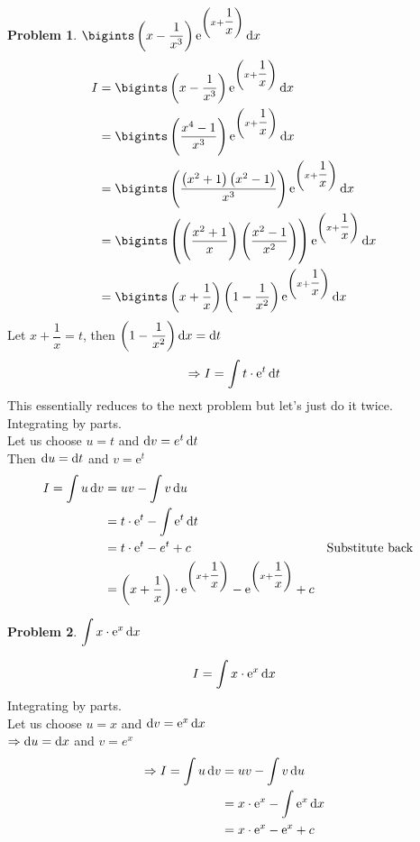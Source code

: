 \documentclass[14]{article}
\theoremstyle{definition}
\newtheorem{prob}{Problem}
\theoremstyle{case}
\begin{document}
\begin{prob}
$\displaystyle \bigints \left( x - \dfrac1{x^3} \right) {\mathrm{e}}^{\left(x + \dfrac1x\right)} \dif x$
\begin{align*}
I &= \bigints \left( x - \dfrac1{x^3} \right) {\mathrm{e}}^{\left(x + \dfrac1x\right)} \dif x\\
&=\bigints \left(\dfrac{x^4 - 1}{x^3} \right) {\mathrm{e}}^{\left(x + \dfrac1x\right)} \dif x\\
&=\bigints \left(\dfrac{\left(x^2 + 1\right)\left(x^2 - 1\right)}{x^3} \right) {\mathrm{e}}^{\left(x + \dfrac1x\right)} \dif x\\
&= \bigints \left( \left( \dfrac{x^2 + 1}{x} \right) \left( \dfrac{x^2 - 1}{x^2} \right) \right) {\mathrm{e}}^{\left(x + \dfrac1x\right)} \dif x\\
&= \bigints  \left( x + \dfrac1x \right) \left( 1 - \dfrac1{x^2} \right) {\mathrm{e}}^{\left(x + \dfrac1x\right)} \dif x
\end{align*}
Let $x + \dfrac1x = t$, then $\left(1 - \dfrac1{x^2}\right) \dif x = \dif t$
\[\Rightarrow I = \int t \cdot \mathrm{e}^t \dif t\]
This essentially reduces to the next problem but let's just do it twice.\\
Integrating by parts.\\
Let us choose $u = t$ and $\dif v = e^t \dif t$\\
Then $\dif u = \dif t$ and $v = \mathrm{e}^t$
\begin{align*}
I = \int u \dif v &= uv - \int v \dif u\\
&= t\cdot \mathrm{e}^t - \int \mathrm{e}^t \dif t\\
&= t\cdot \mathrm{e}^t - e^t + c && \text{Substitute back}\\
&= {\left(x + \dfrac1x\right)} \cdot \mathrm{e}^{\left(x + \dfrac1x\right)} - \mathrm{e}^{\left(x + \dfrac1x\right)} + c
\end{align*}
\end{prob}
\pagebreak
\begin{prob}
$\displaystyle\int x \cdot {\rm e}^x \dif x$
\end{prob}
\[I = \int x \cdot {\rm e}^x \dif x\]
Integrating by parts.\\
Let us choose $u = x$ and $\dif v = {\rm e}^x \dif x$\\
$\Rightarrow \dif u = \dif x$ and $v = e^x$
\begin{align*}
\Rightarrow I = \int u \dif v &= uv - \int v \dif u\\
&= x\cdot {\rm e}^x - \int {\rm e}^x \dif x\\
&= x\cdot {\rm e}^x - {\rm e}^x + c
\end{align*}
\end{document}
